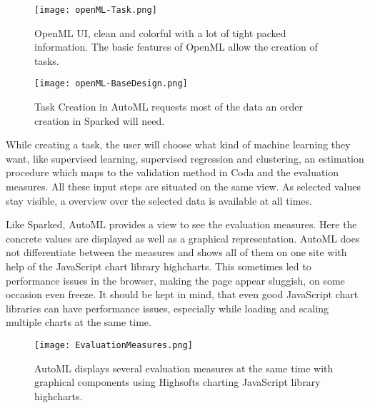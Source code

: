 \begin{figure}
	\texttt{[image: openML-Task.png]}
	\caption{OpenML UI, clean and colorful with a lot of tight packed information. The basic features of OpenML allow the creation of tasks. }
\end{figure}

\begin{figure}
	\texttt{[image: openML-BaseDesign.png]}
	\caption{Task Creation in AutoML requests most of the data an order creation in Sparked will need. }
\end{figure}

While creating a task, the user will choose what kind of machine learning they want, like supervised learning, supervised regression and clustering, an estimation procedure which maps to the validation method in Coda and the evaluation measures. All these input steps are situated on the same view. As selected values stay visible, a overview over the selected data is available at all times.

Like Sparked, AutoML provides a view to see the evaluation measures. Here the concrete values are displayed as well as a graphical representation. AutoML does not differentiate between the measures and shows all of them on one site with help of the JavaScript chart library highcharts. This sometimes led to performance issues in the browser, making the page appear sluggish, on some occasion even freeze. It should be kept in mind, that even good JavaScript chart libraries can have performance issues, especially while loading and scaling multiple charts at the same time.


\begin{figure}
	\texttt{[image: EvaluationMeasures.png]}
	\caption{AutoML displays several evaluation measures at the same time with graphical components using Highsofts charting JavaScript library highcharts. }
\end{figure}
